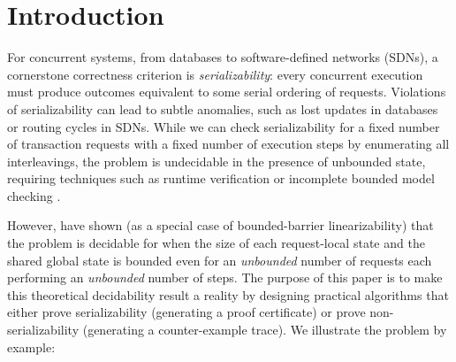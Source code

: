\section{Introduction}
\label{sec:introduction}

For concurrent systems, from databases to software-defined networks (SDNs), a cornerstone correctness criterion is \emph{serializability}: every concurrent execution must produce outcomes equivalent to some serial ordering of requests. Violations of serializability can lead to subtle anomalies, such as lost updates in databases or routing cycles in SDNs.
While we can check serializability for a fixed number of transaction requests with a fixed number of execution steps by enumerating all interleavings, the problem is undecidable in the presence of unbounded state, requiring techniques such as runtime verification or incomplete bounded model checking \cite{WaSt06a,WaSt06b,FlFrYi08,FaMa08,SiMaWaGu11a,SiMaWaGu11b,Pa79,AlMcPe96,BiEn19}.

However, \citet{BoEmEnHa13} have shown (as a special case of bounded-barrier linearizability) that the problem is decidable for when the size of each request-local state and the shared global state is bounded even for an \emph{unbounded} number of requests each performing an \emph{unbounded} number of steps. The purpose of this paper is to make this theoretical decidability result a reality by designing practical algorithms that either prove serializability (generating a proof certificate) or prove non-serializability (generating a counter-example trace).
% 
We illustrate the problem by example:


